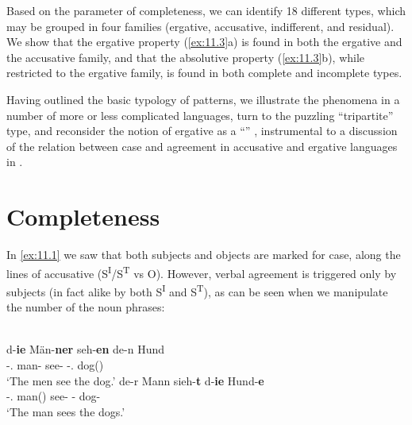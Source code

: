 \documentclass[output=paper]{langsci/langscibook}
\begin{document}
Based on the parameter of completeness, we can identify 18 different
 types, which may be grouped in four families (ergative,
accusative, indifferent, and residual). We show that the ergative property
(\ref{ex:11.3}a) is found in both the ergative and the accusative family,
and that the absolutive property (\ref{ex:11.3}b), while restricted to the
ergative family, is found in both complete and incomplete types.

Having outlined the basic typology of  patterns, we illustrate the
phenomena in a number of more or less complicated languages, turn to the
puzzling \enquote{tripartite}  type, and reconsider the notion of
ergative as a \enquote{} \citep{Marantz1991}, instrumental
to a discussion of the relation between case and agreement in accusative and
ergative languages in \citet{Bobaljik2008}.

\section{Completeness}\label{sec:11.2}

In  \eqref{ex:11.1} we saw that both subjects and objects are marked for case, along
the lines of accusative  (S\textsuperscript{I}/S\textsuperscript{T} vs
O). However, verbal agreement is triggered only by subjects (in fact alike by
both S\textsuperscript{I} and S\textsuperscript{T}), as can be seen when we
manipulate the number of the noun phrases:

\ea%
    \label{ex:11.4}\\
	\ea
		\gll d-\textbf{ie}        Män-\textbf{ner}  seh-\textbf{en}  de-n      Hund\\
			\Det-\Nom.\Pl{}  man-\Pl{}    see-\Pl{} \Det-\glossN.\Acc{}  dog(\glossN)\\
		\glt ‘The men see the dog.’
	\ex
		\gll de-r        Mann    sieh-\textbf{t}  d-\textbf{ie}      Hund-\textbf{e}\\
			\Det-\M.\Nom{}  man(\M{})  see-\Tsg{} \Det-\Acc{}  dog-\Pl{}\\
		\glt ‘The man sees the dogs.’
	\z
\z
\end{document}
